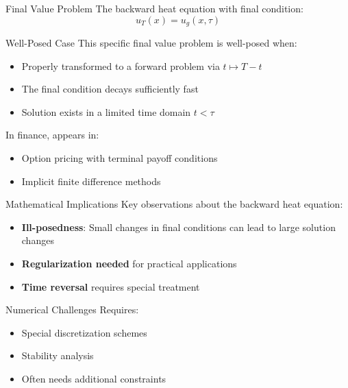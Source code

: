 \documentclass{beamer}
\begin{document}
\begin{frame}{Final Value Problem}
    The backward heat equation with final condition:
    \[
    u_T(x) = u_g(x,\tau)
    \]
    
    \begin{block}{Well-Posed Case}
        This specific final value problem is well-posed when:
        \begin{itemize}
            \item Properly transformed to a forward problem via $t \mapsto T-t$
            \item The final condition decays sufficiently fast
            \item Solution exists in a limited time domain $t < \tau$
        \end{itemize}
    \end{block}
    
    \begin{example}
        In finance, appears in:
        \begin{itemize}
            \item Option pricing with terminal payoff conditions
            \item Implicit finite difference methods
        \end{itemize}
    \end{example}
\end{frame}

\begin{frame}{Mathematical Implications}
    Key observations about the backward heat equation:
    \begin{itemize}
        \item \textbf{Ill-posedness}: Small changes in final conditions can lead to large solution changes
        \item \textbf{Regularization needed} for practical applications
        \item \textbf{Time reversal} requires special treatment
    \end{itemize}
    
    \begin{alertblock}{Numerical Challenges}
        Requires:
        \begin{itemize}
            \item Special discretization schemes
            \item Stability analysis
            \item Often needs additional constraints
        \end{itemize}
    \end{alertblock}
\end{frame}
\end{document}
